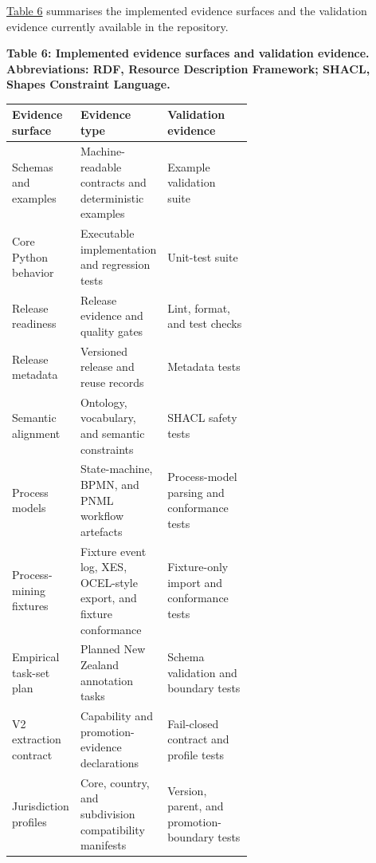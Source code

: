 \documentclass[
]{article}
\begin{document}
\hyperlink{tab-evidence-surfaces}{Table 6} summarises the implemented
evidence surfaces and the validation evidence currently available in the
repository.

\begin{table}[htbp]
\small
\hypertarget{tab-evidence-surfaces}{}
\begin{center}\small\textbf{Table 6: Implemented evidence surfaces and validation evidence. Abbreviations: RDF, Resource Description Framework; SHACL, Shapes Constraint Language.}\end{center}
\begin{tabularx}{\linewidth}{>{\raggedright\arraybackslash}p{0.26\linewidth}>{\raggedright\arraybackslash}p{0.34\linewidth}X}
\toprule
Evidence surface & Evidence type & Validation evidence \\
\midrule
Schemas and examples & Machine-readable contracts and deterministic examples & Example validation suite \\
Core Python behavior & Executable implementation and regression tests & Unit-test suite \\
Release readiness & Release evidence and quality gates & Lint, format, and test checks \\
Release metadata & Versioned release and reuse records & Metadata tests \\
Semantic alignment & Ontology, vocabulary, and semantic constraints & SHACL safety tests \\
Process models & State-machine, BPMN, and PNML workflow artefacts & Process-model parsing and conformance tests \\
Process-mining fixtures & Fixture event log, XES, OCEL-style export, and fixture conformance & Fixture-only import and conformance tests \\
Empirical task-set plan & Planned New Zealand annotation tasks & Schema validation and boundary tests \\
V2 extraction contract & Capability and promotion-evidence declarations & Fail-closed contract and profile tests \\
Jurisdiction profiles & Core, country, and subdivision compatibility manifests & Version, parent, and promotion-boundary tests \\
\bottomrule
\end{tabularx}
\end{table}
\end{document}
